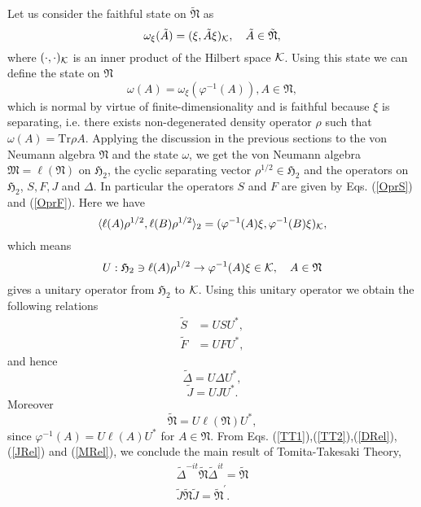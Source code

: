 Let us consider the faithful state on $\tilde{\mathfrak{N}}$ as
$$
\omega_\xi(\tilde{A})=(\xi,\tilde{A}\xi)_{\cal K},\quad \tilde{A}\in \tilde{\mathfrak{N}},
$$
where $(\cdot,\cdot)_{\cal K}$ is an inner product of the Hilbert space ${\cal K}$.
Using this state we can define the state on $\mathfrak{N}$
$$
\omega(A)=\omega_\xi(\varphi^{-1}(A)),A\in \mathfrak{N},
$$
which is normal by virtue of finite-dimensionality and is faithful because $\xi$ is separating, i.e. there exists non-degenerated density operator $\rho$ such that $\omega(A)=\mbox{Tr}\rho A$.
Applying the discussion in the previous sections to the von Neumann algebra $\mathfrak{N}$ and the state
$\omega$, we get
the von Neumann algebra $\mathfrak{M}=\ell (\mathfrak{N})$ on  
$\mathfrak{H}_2$, the cyclic separating vector $\rho^{1/2}\in \mathfrak{H}_2$
and the operators on $\mathfrak{H}_2$, $S, F, J$ and $\Delta$.
In particular the operators $S$ and $F$ are given by Eqs. (\ref{OprS}) and (\ref{OprF}).
Here we have
$$
\langle \ell(A)\rho^{1/2},\ell( B)\rho^{1/2}\rangle_2=(\varphi^{-1}(A)\xi,\varphi^{-1}(B)\xi)_{\cal K},
$$
which means
$$
U:\mathfrak{H}_2\ni\ell(A)\rho^{1/2}\to \varphi^{-1}(A)\xi\in {\cal K}, \quad A\in \mathfrak{N}
$$
gives a unitary operator from $\mathfrak{H}_2$ to ${\cal K}$.
Using this unitary operator we obtain the following relations
\begin{equation}
\begin{split}
\tilde{S}&=US U^{\ast},\\
\tilde{F}&=UFU^\ast ,
\end{split}
\end{equation}
and hence 
\begin{equation}\label{DRel}
\tilde{\Delta}=U\Delta U^\ast,
\end{equation}
\begin{equation}\label{JRel}
\tilde{J}=UJU^\ast.
\end{equation}
Moreover  
\begin{equation}\label{MRel}
\tilde{\mathfrak{N}}=U\ell(\mathfrak{N})U^\ast,
\end{equation}
since $\varphi^{-1}(A)=U\ell (A) U^\ast$ for $A\in \mathfrak{N}$.
From Eqs. (\ref{TT1}),(\ref{TT2}),(\ref{DRel}),(\ref{JRel}) and (\ref{MRel}), we conclude the main result of Tomita-Takesaki Theory,
\begin{equation}
\begin{split}
\tilde{\Delta}^{-it}\tilde{\mathfrak{N}}\tilde{\Delta}^{it}=\tilde{\mathfrak{N}}\\
\tilde{J}\tilde{\mathfrak{N}}\tilde{J}=\tilde{\mathfrak{N}}^\prime.
\end{split}
\end{equation}



